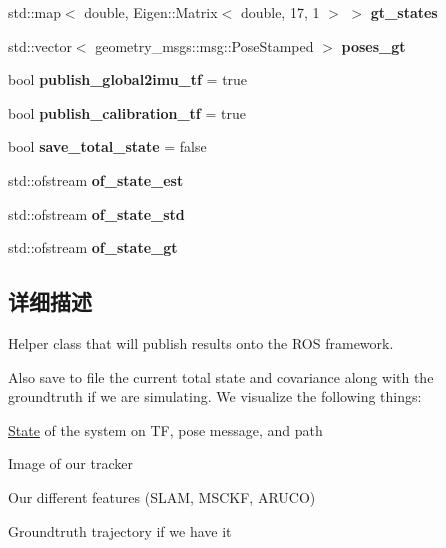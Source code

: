 \begin{DoxyCompactItemize}
std\+::map$<$ double, Eigen\+::\+Matrix$<$ double, 17, 1 $>$ $>$ {\bfseries gt\+\_\+states}
\item 
\mbox{\label{classov__msckf_1_1ROS2Visualizer_ae207f16406cb99dfd752291750f859fc}} 
std\+::vector$<$ geometry\+\_\+msgs\+::msg\+::\+Pose\+Stamped $>$ {\bfseries poses\+\_\+gt}
\item 
\mbox{\label{classov__msckf_1_1ROS2Visualizer_a9d79dfc6a3476a1147dfd25f817ff9d5}} 
bool {\bfseries publish\+\_\+global2imu\+\_\+tf} = true
\item 
\mbox{\label{classov__msckf_1_1ROS2Visualizer_a7eac7eb727e5670bf9981eee45325631}} 
bool {\bfseries publish\+\_\+calibration\+\_\+tf} = true
\item 
\mbox{\label{classov__msckf_1_1ROS2Visualizer_a8f52abe9f907981edbe866664549bbf6}} 
bool {\bfseries save\+\_\+total\+\_\+state} = false
\item 
\mbox{\label{classov__msckf_1_1ROS2Visualizer_a5ef7d80542a74e6ef2f146cc5bad4320}} 
std\+::ofstream {\bfseries of\+\_\+state\+\_\+est}
\item 
\mbox{\label{classov__msckf_1_1ROS2Visualizer_a7a69323dfd959c997384d1eb2bb26817}} 
std\+::ofstream {\bfseries of\+\_\+state\+\_\+std}
\item 
\mbox{\label{classov__msckf_1_1ROS2Visualizer_a1b7bcd2fc53fd93efd293870351f6991}} 
std\+::ofstream {\bfseries of\+\_\+state\+\_\+gt}
\end{DoxyCompactItemize}


\subsection{详细描述}
Helper class that will publish results onto the R\+OS framework. 

Also save to file the current total state and covariance along with the groundtruth if we are simulating. We visualize the following things\+:
\begin{DoxyItemize}
\item \hyperlink{classov__msckf_1_1State}{State} of the system on TF, pose message, and path
\item Image of our tracker
\item Our different features (S\+L\+AM, M\+S\+C\+KF, A\+R\+U\+CO)
\item Groundtruth trajectory if we have it 
\end{DoxyItemize}

